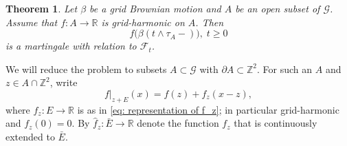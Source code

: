 \documentclass[11pt]{article}
\numberwithin{equation}{section}
\newtheorem{theorem}{Theorem}
\begin{document}
\begin{theorem}
  \label{harmonic function of grid BM}
  Let $\beta$ be a grid Brownian motion and 
  $A$ be an open subset of $\mathcal{G}$.
  Assume that $f: A \rightarrow \mathbb{R}$ 
  is grid-harmonic on $A$. Then
  \begin{equation}\nonumber
    f \big( \beta(t \land \tau_A -) \big)  ,\; t \geq 0  
  \end{equation} 
  is a martingale with relation to 
  $\mathcal{F}_t$.
\end{theorem}

We will reduce the problem to subsets 
$A \subset \mathcal{G}$ with 
$\partial A \subset \mathbb{Z}^2$. 
For such an $A$ and $z \in A \cap \mathbb{Z}^2$, write 
\begin{equation}\nonumber
  \left.f\right|_{z+E}(x) = f(z) + f_z(x-z),
\end{equation} 
where $f_z: E \rightarrow \mathbb{R}$ is as 
in \eqref{eq: representation of f_z};
in particular grid-harmonic and $f_z(0)= 0$. 
By $\hat{f}_z: \bar{E} \rightarrow \mathbb{R}$ 
denote the function $f_z$ that is continuously extended to $\bar{E}$. 
\end{document}
